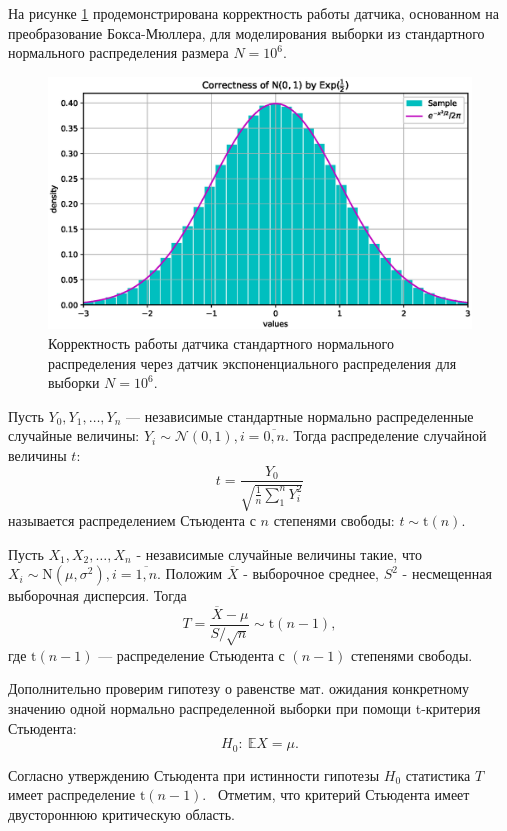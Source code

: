\documentclass[11pt]{report}
\begin{document}
На рисунке \ref{fig:norm-expo} продемонстрирована корректность работы датчика, основанном на преобразование Бокса-Мюллера, для моделирования выборки из стандартного нормального распределения размера $N=10^6$.

\begin{figure}[H]
    \centering
    \includegraphics[width=0.9\linewidth]{images/norm-expo.eps}
    \caption{Корректность работы датчика стандартного нормального распределения через датчик экспоненциального распределения для выборки $N=10^6$.}
    \label{fig:norm-expo}
\end{figure}

\begin{definition}
Пусть $Y_0,Y_1,\dots,Y_n$ --- независимые стандартные нормально распределенные случайные величины: $Y_i\sim\mathcal{N}(0,1),i=\overline{0,n}$. Тогда распределение случайной величины $t$:
$$
t = \dfrac{Y_0}{\sqrt{\frac{1}{n}\sum^n_1Y_i^2}}
$$
называется распределением Стьюдента с $n$ степенями свободы: $t\sim \mathrm{t}(n)$.
\end{definition}

\begin{statement}[Стьюдент]
Пусть $X_1,X_2,\dots,X_n$ - независимые случайные величины такие, что $X_i\sim\mathrm{N}(\mu,\sigma^2), i=\overline{1,n}$.
Положим $\overline{X}$ - выборочное среднее, $S^2$ - несмещенная выборочная дисперсия. Тогда
$$
T=\dfrac{\overline{X}-\mu}{S/\sqrt{n}}\sim \mathrm{t}(n-1),
$$
где $\mathrm{t}(n-1)$ --- распределение Стьюдента с $(n-1)$ степенями свободы.
\end{statement}

Дополнительно проверим гипотезу о равенстве мат. ожидания конкретному значению одной нормально распределенной выборки при помощи t-критерия Стьюдента:
$$
H_0:~ \mathbb{E}X = \mu.
$$

Согласно утверждению Стьюдента при истинности гипотезы $H_0$ статистика $T$ имеет распределение $\mathrm{t}(n-1)$. \
Отметим, что критерий Стьюдента имеет двустороннюю критическую область.
\end{document}
